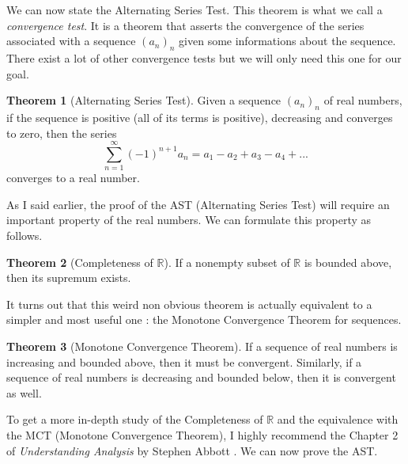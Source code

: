 \documentclass[10pt]{article}
\newcommand{\R}{\mathbb{R}}
\theoremstyle{definition}
\newtheorem*{theorem}{Theorem}
\begin{document}
We can now state the Alternating Series Test. This theorem is what we call a \textit{convergence test}. It is a theorem that asserts the convergence of the series associated with a sequence $(a_n)_n$ given some informations about the sequence. There exist a lot of other convergence tests but we will only need this one for our goal.

\begin{theorem}[Alternating Series Test]
    Given a sequence $(a_n)_n$ of real numbers, if the sequence is positive (all of its terms is positive), decreasing and converges to zero, then the series
    $$\sum_{n=1}^{\infty}(-1)^{n+1}a_n = a_1 - a_2 + a_3 - a_4 + ... $$
    converges to a real number.
\end{theorem}

As I said earlier, the proof of the AST (Alternating Series Test) will require an important property of the real numbers. We can formulate this property as follows.

\begin{theorem}[Completeness of $\R$]
    If a nonempty subset of $\R$ is bounded above, then its supremum exists.
\end{theorem}

It turns out that this weird non obvious theorem is actually equivalent to a simpler and most useful one : the Monotone Convergence Theorem for sequences.

\begin{theorem}[Monotone Convergence Theorem]
    If a sequence of real numbers is increasing and bounded above, then it must be convergent. Similarly, if a sequence of real numbers is decreasing and bounded below, then it is convergent as well.
\end{theorem}

To get a more in-depth study of the Completeness of $\R$ and the equivalence with the MCT (Monotone Convergence Theorem), I highly recommend the Chapter 2 of \textit{Understanding Analysis} by Stephen Abbott \cite{understanding_analysis}. We can now prove the AST.
\end{document}
